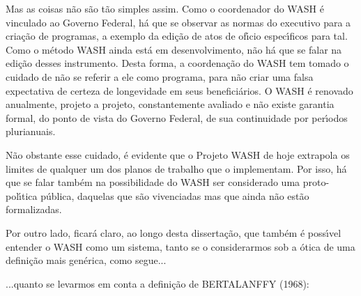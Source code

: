 \documentclass[
12pt,		%
openright,	%
twoside,  %
a4paper,			%
chapter=TITLE,		%
english,			%
french,				%
spanish,			%
brazil				%
]{USPSC-classe/USPSC}
\begin{document}
Mas as coisas n\~ao s\~ao t\~ao simples assim. Como o coordenador do WASH \'e vinculado ao Governo Federal, h\'a que se observar as normas do executivo para a cria\c{c}\~ao de programas, a exemplo da edi\c{c}\~ao de atos de of\'{\i}cio espec\'{\i}ficos para tal. Como o m\'etodo WASH ainda est\'a em desenvolvimento, n\~ao h\'a que se falar na edi\c{c}\~ao desses instrumento. Desta forma, a coordena\c{c}\~ao do WASH tem tomado o cuidado de n\~ao se referir a ele como programa, para n\~ao criar uma falsa expectativa de certeza de longevidade em seus benefici\'arios. O WASH \'e renovado anualmente, projeto a projeto, constantemente avaliado e n\~ao existe garantia formal, do ponto de vista do Governo Federal, de sua continuidade por per\'{\i}odos plurianuais.









N\~ao obstante esse cuidado, \'e evidente que o Projeto WASH de hoje extrapola os limites de qualquer um dos planos de trabalho que o implementam. Por isso, h\'a que se falar tamb\'em na possibilidade do WASH ser considerado uma proto-pol\'{\i}tica p\'ublica, daquelas que s\~ao vivenciadas mas que ainda n\~ao est\~ao formalizadas.









Por outro lado, ficar\'a claro, ao longo desta disserta\c{c}\~ao, que tamb\'em \'e poss\'{\i}vel entender o WASH como um sistema, tanto se o considerarmos sob a \'otica de uma defini\c{c}\~ao mais gen\'erica, como segue...










\noindent\begin{center}\mbox{\centering{}}\end{center}


...quanto se levarmos em conta a defini\c{c}\~ao de  BERTALANFFY (1968):
\end{document}
